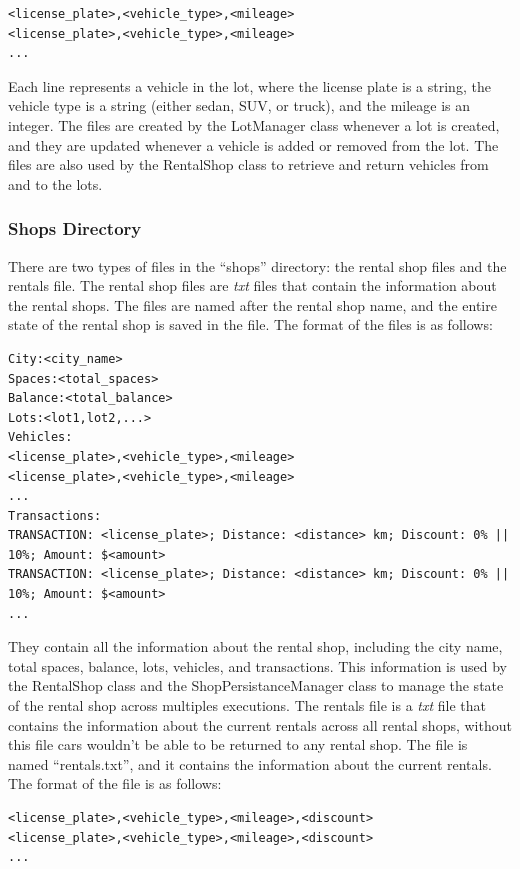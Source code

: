 \documentclass[conference]{IEEEtran}
\begin{document}
\begin{lstlisting}[style=input]
<license_plate>,<vehicle_type>,<mileage>
<license_plate>,<vehicle_type>,<mileage>
...
\end{lstlisting}

Each line represents a vehicle in the lot, where the license plate is a string, the vehicle type is a string (either sedan, SUV, or truck), and the mileage is an integer. The files are created by the LotManager class whenever a lot is created, and they are updated whenever a vehicle is added or removed from the lot. The files are also used by the RentalShop class to retrieve and return vehicles from and to the lots.

\subsubsection{Shops Directory}
There are two types of files in the ``shops'' directory: the rental shop files and the rentals file. The rental shop files are \textit{txt} files that contain the information about the rental shops. The files are named after the rental shop name, and the entire state of the rental shop is saved in the file. The format of the files is as follows:

\begin{lstlisting}[style=input]
City:<city_name>
Spaces:<total_spaces>
Balance:<total_balance>
Lots:<lot1,lot2,...>
Vehicles:
<license_plate>,<vehicle_type>,<mileage>
<license_plate>,<vehicle_type>,<mileage>
... 
Transactions:
TRANSACTION: <license_plate>; Distance: <distance> km; Discount: 0% || 10%; Amount: $<amount>
TRANSACTION: <license_plate>; Distance: <distance> km; Discount: 0% || 10%; Amount: $<amount>
...
\end{lstlisting}

They contain all the information about the rental shop, including the city name, total spaces, balance, lots, vehicles, and transactions. This information is used by the RentalShop class and the ShopPersistanceManager class to manage the state of the rental shop across multiples executions. The rentals file is a \textit{txt} file that contains the information about the current rentals across all rental shops, without this file cars wouldn't be able to be returned to any rental shop. The file is named ``rentals.txt'', and it contains the information about the current rentals. The format of the file is as follows:

\begin{lstlisting}[style=input]
<license_plate>,<vehicle_type>,<mileage>,<discount> 
<license_plate>,<vehicle_type>,<mileage>,<discount>
... 
\end{lstlisting}
\end{document}
